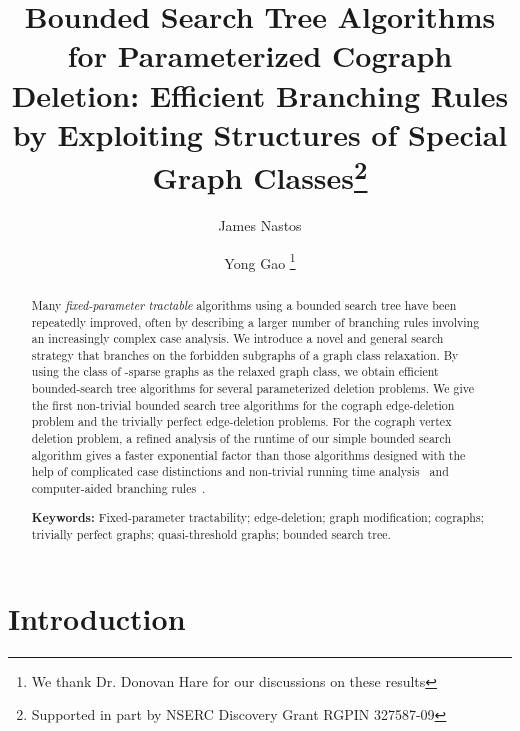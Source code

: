 \documentclass{llncs}
\begin{document}
 

\title{Bounded Search Tree Algorithms for Parameterized Cograph Deletion: Efficient Branching Rules by Exploiting Structures of Special Graph Classes\thanks{Supported in part by NSERC Discovery Grant RGPIN 327587-09}}
\author{James Nastos \and Yong Gao \thanks{We thank Dr. Donovan Hare for our discussions on these results}}

\maketitle

\begin{abstract}
Many \emph{fixed-parameter tractable} algorithms using a bounded search tree have been repeatedly improved, often by describing a larger number of branching rules involving an increasingly complex case analysis. We introduce a novel and general search strategy that branches on the forbidden subgraphs of a graph class relaxation. By using the class of -sparse graphs as the relaxed graph class, we obtain efficient bounded-search tree algorithms for several parameterized deletion problems. We give the first non-trivial bounded search tree algorithms for the cograph edge-deletion problem and the trivially perfect edge-deletion problems. For the cograph vertex deletion problem, a refined analysis of the runtime of our simple bounded search algorithm gives a faster exponential factor than those algorithms designed with the help of complicated case distinctions and non-trivial running time analysis~\cite{NiRo} and computer-aided branching rules~\cite{GGHN}.

\smallskip
\textbf{Keywords:} Fixed-parameter tractability; edge-deletion; graph modification; cographs; trivially perfect graphs; quasi-threshold graphs; bounded search tree.


\end{abstract}

\normalsize


\section{Introduction}
\end{document}
